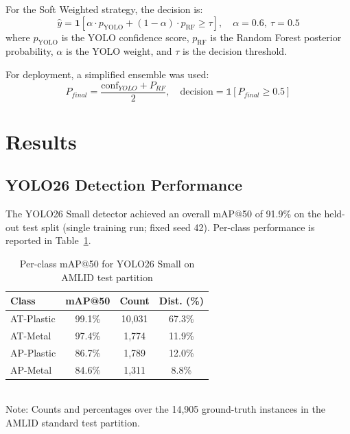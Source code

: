\documentclass[conference]{IEEEtran}
\begin{document}
For the Soft Weighted strategy, the decision is:
\begin{equation}
  \hat{y} = \mathbf{1}\!\left[
    \alpha \cdot p_{\text{YOLO}} + (1-\alpha) \cdot p_{\text{RF}}
    \geq \tau
  \right], \quad \alpha = 0.6,\ \tau = 0.5
  \label{eq:soft_weighted}
\end{equation}
where $p_{\text{YOLO}}$ is the YOLO confidence score, $p_{\text{RF}}$ is the Random Forest posterior probability, $\alpha$ is the YOLO weight, and $\tau$ is the decision threshold.

For deployment, a simplified ensemble was used:
\begin{equation}
  P_{final} = \frac{\text{conf}_{YOLO} + P_{RF}}{2}, \quad
  \text{decision} = \mathbb{1}[P_{final} \geq 0.5]
  \label{eq:deployment}
\end{equation}

\section{Results}

\subsection{YOLO26 Detection Performance}

The YOLO26 Small detector achieved an overall mAP@50 of 91.9\% on the held-out test split (single training run; fixed seed 42). Per-class performance is reported in Table~\ref{tab:per_class}.

\begin{table}[t]
  \centering
  \caption{Per-class mAP@50 for YOLO26 Small on AMLID test partition}
  \label{tab:per_class}
  \begin{tabular}{lccc}
    \hline
    \textbf{Class} & \textbf{mAP@50} & \textbf{Count} & \textbf{Dist. (\%)} \\
    \hline
    AT-Plastic & 99.1\% & 10,031 & 67.3\% \\
    AT-Metal   & 97.4\% & 1,774 & 11.9\% \\
    AP-Plastic & 86.7\% & 1,789 & 12.0\% \\
    AP-Metal   & 84.6\% & 1,311 & 8.8\% \\
    \hline
  \end{tabular}\\[4pt]
  {\footnotesize Note: Counts and percentages over the 14,905 ground-truth instances in the AMLID standard test partition.}
\end{table}
\end{document}
